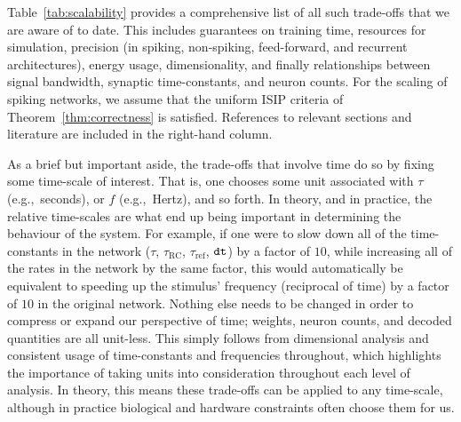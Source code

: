 Table~\ref{tab:scalability} provides a comprehensive list of all such trade-offs that we are aware of to date.
This includes guarantees on training time, resources for simulation, precision (in spiking, non-spiking, feed-forward, and recurrent architectures), energy usage, dimensionality, and finally relationships between signal bandwidth, synaptic time-constants, and neuron counts.
For the scaling of spiking networks, we assume that the uniform ISIP criteria of Theorem~\ref{thm:correctness} is satisfied.
References to relevant sections and literature are included in the right-hand column.

As a brief but important aside, the trade-offs that involve time do so by fixing some time-scale of interest.
That is, one chooses some unit associated with $\tau$ (e.g.,~seconds), or $f$ (e.g.,~Hertz), and so forth.
In theory, and in practice, the relative time-scales are what end up being important in determining the behaviour of the system.
For example, if one were to slow down all of the time-constants in the network ($\tau$, $\tau_\text{RC}$, $\tau_\text{ref}$, $\texttt{dt}{}$) by a factor of $10$, while increasing all of the rates in the network by the same factor, this would automatically be equivalent to speeding up the stimulus' frequency (reciprocal of time) by a factor of $10$ in the original network.
Nothing else needs to be changed in order to compress or expand our perspective of time; weights, neuron counts, and decoded quantities are all unit-less.
This simply follows from dimensional analysis and consistent usage of time-constants and frequencies throughout, which highlights the importance of taking units into consideration throughout each level of analysis.
In theory, this means these trade-offs can be applied to any time-scale, although in practice biological and hardware constraints often choose them for us.

\iffalse
\TODO{Discuss all of the scaling.}
We usually set $n$ to about $50 \times q$, as this has been found to provide tolerable performance in practice~\citep{braindrop2019}. 
More neurons may be required depending on the difficulty of the function and the frequency of the inputs.
For a fixed amount of noise in a represention implemented by an ensemble of $n$ neurons, the current best-known lower-bound predicts the dimensionality $d$ scales as $\Omega \left( n^{\frac{2}{3}} \right)$ for $n$ neurons~citep[][p.~60]{jgosmann2018}.
Although we don't know the upper-bound, we conjecture that it is $\bigoh{n}$.
That is, the dimensionality should not be able to scale faster than the neuron count.
If it could, then each neuron would represent $\omega(1)$ dimensions, which seems physically implausible given access to only $\bigoh{1}$ state variables.
This limitation could be broken by dendritic computation, for instance if each neuron had access to $\bigoh{n}$ variables distributed along the dendritic tree.
\fi

